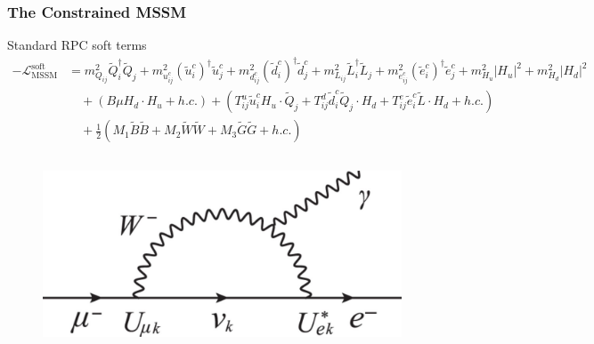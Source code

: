 \documentclass[10pt,aspectratio=169]{beamer}
\begin{document}
\begin{frame}
  \frametitle{The Constrained MSSM}
  \vspace*{-10pt}
  \begin{block}{Standard RPC soft terms}
    \begin{align*}
      -\mathcal{L}_{\text{MSSM}}^{\text{soft}} &=
      m_{Q_{ij}}^2 \tilde{Q}_i^\dagger \tilde{Q}_j + m_{u^c_{ij}}^2
      (\tilde{u}^c_i)^\dagger \tilde{u}^c_j + m_{d^c_{ij}}^2
      (\tilde{d}^c_i)^\dagger \tilde{d}^c_j + m_{L_{ij}}^2 \tilde{L}_i^\dagger
      \tilde{L}_j + m_{e^c_{ij}}^2 (\tilde{e}^c_i)^\dagger \tilde{e}^c_j
      + m_{H_u}^2 |H_u|^2 + m_{H_d}^2 |H_d|^2 \\
      & \quad {} + \left ( B\mu H_d \cdot H_u + h.c. \right )
      +  \left ( T^u_{ij}\tilde{u}_i^c H_{u} \cdot \tilde{Q}_j
      + T^d_{ij} \tilde{d}_i^c \tilde{Q}_j \cdot H_{d}
      + T^e_{ij} \tilde{e}_i^c \tilde{L} \cdot H_{d} + h.c. \right ) \\
      & \quad {}  + \frac{1}{2} \left ( M_1 \tilde{B} \tilde{B}
      + M_2 \tilde{W} \tilde{W} + M_3 \tilde{G} \tilde{G} + h.c. \right )
    \end{align*}
  \end{block}
  \vspace*{-10pt}
  \begin{columns}[t]
    \begin{column}{0.5\textwidth}
      \begin{columns}[t]
        \begin{column}{0.5\textwidth}
          \vspace*{5pt}
          \begin{figure}
            \includegraphics[width=\textwidth]{comet_sm_clfv}
          \end{figure}
        \end{column}
        \begin{column}{0.5\textwidth}

\end{column}
\end{columns}
\end{column}
\end{columns}
\end{frame}
\end{document}
